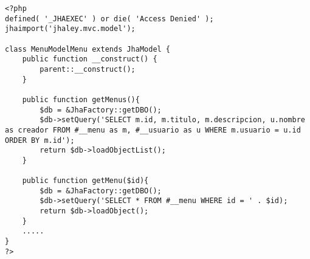 \begin{lstlisting}[label=singleton,caption=Patr\'on Singleton en acci\'on]
<?php
defined( '_JHAEXEC' ) or die( 'Access Denied' );
jhaimport('jhaley.mvc.model');

class MenuModelMenu extends JhaModel {
    public function __construct() {
        parent::__construct();
    }
    
    public function getMenus(){
    	$db = &JhaFactory::getDBO();
        $db->setQuery('SELECT m.id, m.titulo, m.descripcion, u.nombre as creador FROM #__menu as m, #__usuario as u WHERE m.usuario = u.id ORDER BY m.id');
        return $db->loadObjectList();
    }
    
	public function getMenu($id){
    	$db = &JhaFactory::getDBO();
        $db->setQuery('SELECT * FROM #__menu WHERE id = ' . $id);
        return $db->loadObject();
    }
    .....
}
?>
\end{lstlisting}
